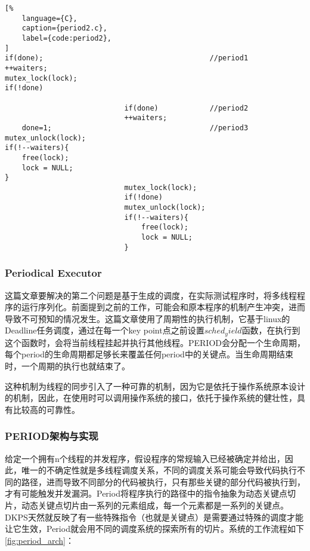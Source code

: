 \begin{spacing}{1.0}
\begin{lstlisting}[%
    language={C},
    caption={period2.c},
    label={code:period2},
]
if(done);                                       //period1
++waiters;
mutex_lock(lock); 
if(!done) 

                            if(done)            //period2
                            ++waiters;
    done=1;                                     //period3
mutex_unlock(lock); 
if(!--waiters){ 
    free(lock); 
    lock = NULL; 
} 
                            mutex_lock(lock); 
                            if(!done)
                            mutex_unlock(lock);
                            if(!--waiters){ 
                                free(lock); 
                                lock = NULL; 
                            }
\end{lstlisting}
\end{spacing}

\subsubsection{Periodical Executor}

这篇文章要解决的第二个问题是基于生成的调度，在实际测试程序时，将多线程程序的运行序列化。前面提到之前的工作，可能会和原本程序的机制产生冲突，进而导致不可预知的情况发生。这篇文章使用了周期性的执行机制，它基于linux的Deadline任务调度，通过在每一个key point点之前设置$sched_yield$函数，在执行到这个函数时，会将当前线程挂起并执行其他线程。PERIOD会分配一个生命周期，每个period的生命周期都足够长来覆盖任何period中的关键点。当生命周期结束时，一个周期的执行也就结束了。

这种机制为线程的同步引入了一种可靠的机制，因为它是依托于操作系统原本设计的机制，因此，在使用时可以调用操作系统的接口，依托于操作系统的健壮性，具有比较高的可靠性。

\subsubsection{PERIOD架构与实现}

给定一个拥有n个线程的并发程序，假设程序的常规输入已经被确定并给出，因此，唯一的不确定性就是多线程调度关系，不同的调度关系可能会导致代码执行不同的路径，进而导致不同部分的代码被执行，只有那些关键的部分代码被执行到，才有可能触发并发漏洞。Period将程序执行的路径中的指令抽象为动态关键点切片，动态关键点切片由一系列的元素组成，每一个元素都是一系列的关键点。DKPS天然就反映了有一些特殊指令（也就是关键点）是需要通过特殊的调度才能让它生效，Period就会用不同的调度系统的探索所有的切片。系统的工作流程如下\autoref{fig:period_arch}：

